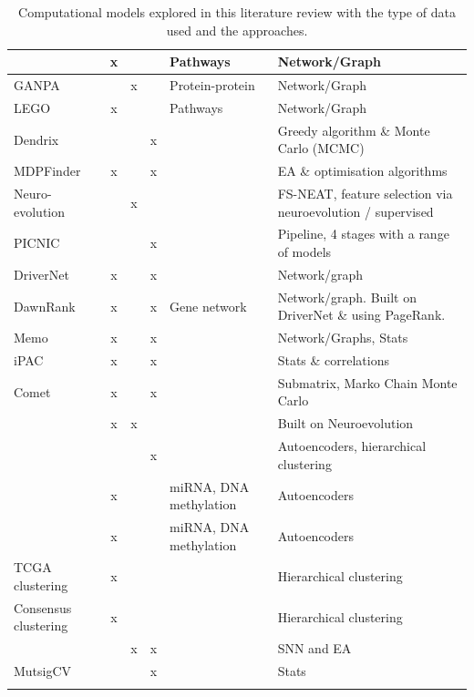 \begin{appendices}
\begin{small}
\begin{longtable}[!h]{|p{2.0cm}|c|p{1.5cm}|c|p{2.2cm}|p{6.0cm}|}
              \endlastfoot    
                \citet{Cava2018-rv} & x &  &  & Pathways & Network/Graph \\ \hline
                GANPA &  & x &  & Protein-protein & Network/Graph \\ \hline
                LEGO & x &  &  &  Pathways  & Network/Graph \\ \hline
                Dendrix &  &  & x &  & Greedy algorithm \& Monte Carlo (MCMC) \\ \hline
                MDPFinder & x &  & x &  &  EA \& optimisation algorithms  \\ \hline
                Neuro-evolution &  & x &  &  & FS-NEAT, feature selection via neuroevolution / supervised \\ \hline
                PICNIC  &  &  & x &  & Pipeline, 4 stages with a range of models \\ \hline
                DriverNet & x &  & x &  & Network/graph \\ \hline
                DawnRank & x &  & x & Gene network &  Network/graph. Built on DriverNet \& using PageRank. \\ \hline
                Memo & x &  & x &  & Network/Graphs, Stats \\ \hline
                iPAC & x &  & x &  &  Stats \& correlations \\ \hline
                Comet  & x &  & x &  & Submatrix, Marko Chain Monte Carlo  \\ \hline
                \citet{Feltes2019-bd} & x & x &  &  & Built on Neuroevolution \\ \hline
                \citet{Palazzo2019-hx} &  &  & x &  & Autoencoders, hierarchical clustering \\ \hline
                \citet{Chaudhary2018-qj} & x &  &  & miRNA, DNA methylation & Autoencoders \\ \hline
                \citet{Ma2019-hk} & x &  &  & miRNA, DNA methylation & Autoencoders \\ \hline
                TCGA clustering & x &  &  &  & Hierarchical clustering \\ \hline
                Consensus clustering & x &  &  &  & Hierarchical clustering \\ \hline
               \citet{Capecci2020-uj} &  & x & x &  & SNN and EA \\ \hline
                MutsigCV &  &  & x &  & Stats \\ \hline
            \caption{Computational models explored in this literature review with the type of data used and the approaches.}
            \label{tab:data_used}
          \end{longtable}
        \end{small}
        

\end{appendices}
